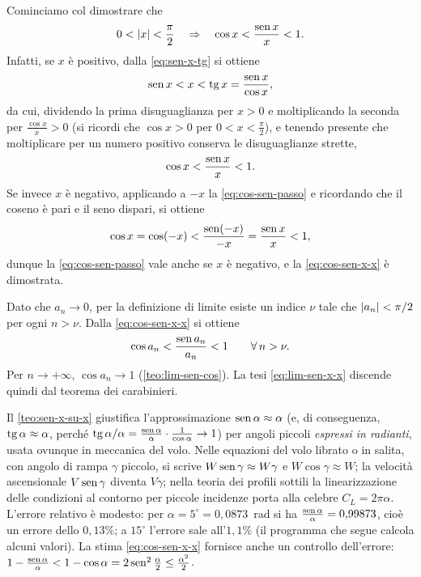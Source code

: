 \begin{dimostrazione}
Cominciamo col dimostrare che
\begin{equation}\label{eq:cos-sen-x-x}
  0<\lvert x\rvert<\frac\pi2 \quad\Rightarrow\quad \cos x<\frac{\operatorname{sen} x}{x}<1 .
\end{equation}
Infatti, se $x$ è positivo, dalla \eqref{eq:sen-x-tg} si ottiene
\begin{equation}\label{eq:sen-x-tg-bis}
  \operatorname{sen} x<x<\operatorname{tg} x=\frac{\operatorname{sen} x}{\cos x},
\end{equation}
da cui, dividendo la prima disuguaglianza per $x>0$ e moltiplicando la seconda per
$\frac{\cos x}{x}>0$ (si ricordi che $\cos x>0$ per $0<x<\frac\pi2$), e tenendo presente
che moltiplicare per un numero positivo conserva le disuguaglianze strette,
\begin{equation}\label{eq:cos-sen-passo}
  \cos x<\frac{\operatorname{sen} x}{x}<1 .
\end{equation}
Se invece $x$ è negativo, applicando a $-x$ la \eqref{eq:cos-sen-passo} e ricordando che il
coseno è pari e il seno dispari, si ottiene
\begin{equation}\label{eq:cos-sen-negativo}
  \cos x=\cos(-x)<\frac{\operatorname{sen}(-x)}{-x}=\frac{\operatorname{sen} x}{x}<1,
\end{equation}
dunque la \eqref{eq:cos-sen-passo} vale anche se $x$ è negativo, e la \eqref{eq:cos-sen-x-x}
è dimostrata.

Dato che $a_{n}\to0$, per la definizione di limite esiste un indice $\nu$ tale che
$\lvert a_{n}\rvert<\pi/2$ per ogni $n>\nu$. Dalla \eqref{eq:cos-sen-x-x} si ottiene
\begin{equation}\label{eq:sen-x-x-carabinieri}
  \cos a_{n}<\frac{\operatorname{sen} a_{n}}{a_{n}}<1 \qquad\forall\, n>\nu .
\end{equation}
Per $n\to+\infty$, $\cos a_{n}\to1$ (\cref{teo:lim-sen-cos}). La tesi
\eqref{eq:lim-sen-x-x} discende quindi dal teorema dei carabinieri.
\end{dimostrazione}

\begin{idea}
Il \cref{teo:sen-x-su-x} giustifica l'approssimazione $\operatorname{sen}\alpha\approx\alpha$ (e, di
conseguenza, $\operatorname{tg}\alpha\approx\alpha$, perché $\operatorname{tg}\alpha/\alpha=\frac{\operatorname{sen}\alpha}{\alpha}\cdot
\frac1{\cos\alpha}\to1$) per angoli piccoli \emph{espressi in radianti}, usata
ovunque in meccanica del volo. Nelle equazioni del volo librato o in salita, con
angolo di rampa $\gamma$ piccolo, si scrive $W\operatorname{sen}\gamma\approx W\gamma$ e
$W\cos\gamma\approx W$; la velocità ascensionale $V\operatorname{sen}\gamma$ diventa $V\gamma$; nella
teoria dei profili sottili la linearizzazione delle condizioni al contorno per piccole
incidenze porta alla celebre $C_{L}=2\pi\alpha$. L'errore relativo è modesto: per
$\alpha=5^{\circ}=0{,}0873$~rad si ha $\frac{\operatorname{sen}\alpha}{\alpha}=0{,}99873$, cioè un errore
dello $0{,}13\%$; a $15^{\circ}$ l'errore sale all'$1{,}1\%$ (il programma che segue
calcola alcuni valori). La stima \eqref{eq:cos-sen-x-x} fornisce anche un controllo
dell'errore: $1-\frac{\operatorname{sen}\alpha}{\alpha}<1-\cos\alpha=2\operatorname{sen}^{2}\frac\alpha2\le\frac{\alpha^{2}}2$.
\end{idea}

